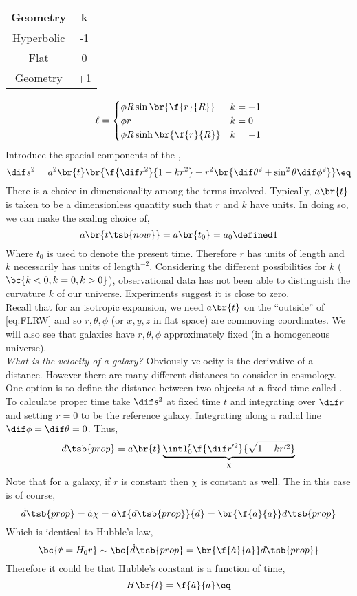 \documentclass{article}
\begin{document}
\begin{center}
\begin{tabular}{|c|c|}
    \hline
    Geometry & k \\
    \hline
    Hyperbolic & -1 \\
    Flat & 0 \\
    Geometry & +1 \\
    \hline
\end{tabular}
\end{center}
\[ \ell = \begin{cases}
    \phi R \sin\br{\f{r}{R}} & k = +1 \\
    \phi r & k = 0 \\
    \phi R \sinh\br{\f{r}{R}} & k = -1 \\
\end{cases} \]
Introduce the spacial components of the ,
\[ \dif s^2 = a^2\br{t}\br{\f{\dif r^2}{1 - kr^2} + r^2 \br{\dif \theta^2 + \sin^2 \theta \dif \phi^2}} \eq \label{eq:FLRW}\]
There is a choice in dimensionality among the terms involved. Typically, $a\br{t}$ is taken to be a dimensionless quantity such that $r$ and $k$ have units. In doing so, we can make the scaling choice of,
\[ a\br{t\tsb{now}} = a\br{t_0} = a_0 \defined 1 \]
Where $t_0$ is used to denote the present time. Therefore $r$ has units of length and $k$ necessarily has units of $\text{length}^{-2}$. Considering the different possibilities for $k$ ($\bc{k < 0, k = 0, k > 0}$), observational data has not been able to distinguish the curvature $k$ of our universe. Experiments suggest it is close to zero. \\

Recall that for an isotropic expansion, we need $a\br{t}$ on the ``outside'' of \cref{eq:FLRW} and so $r,\theta,\phi$ (or $x,y,z$ in flat space) are commoving coordinates. We will also see that galaxies have $r, \theta, \phi$ approximately fixed (in a homogeneous universe).\\

\textit{What is the velocity of a galaxy?} Obviously velocity is the derivative of a distance. However there are many different distances to consider in cosmology. One option is to define the distance between two objects at a fixed time called . To calculate proper time take $\dif s^2$ at fixed time $t$ and integrating over $\dif r$ and setting $r=0$ to be the reference galaxy. Integrating along a radial line $\dif \phi = \dif \theta = 0$. Thus,
\[ d\tsb{prop} = a\br{t} \underbrace{\intl_{0}^{r} \f{\dif r'^2}{\sqrt{1 - k r'^2}}}_{\chi} \]
Note that for a galaxy, if $r$ is constant then $\chi$ is constant as well.
The  in this case is of course,
\[ \dot d\tsb{prop} = \dot a \chi = \dot a \f{d\tsb{prop}}{d} = \br{\f{\dot a}{a}} d\tsb{prop} \]
Which is identical to Hubble's law,
\[ \bc{\dot r = H_0 r} \sim \bc{\dot d\tsb{prop} = \br{\f{\dot a}{a}} d\tsb{prop}}  \]
Therefore it could be that Hubble's constant is a function of time,
\[ H\br{t} = \f{\dot a}{a} \eq \label{eq:hubble_scale_factor} \]
\end{document}
